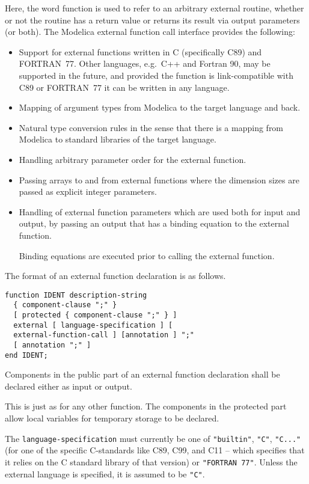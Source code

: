 Here, the word function is used to refer to an arbitrary external
routine, whether or not the routine has a return value or returns its
result via output parameters (or both). The Modelica external function
call interface provides the following:
\begin{itemize}
\item
  Support for external functions written in C (specifically C89) and
  FORTRAN~77. Other languages, e.g.\ C++ and Fortran 90, may be supported
  in the future, and provided the function is link-compatible with C89
  or FORTRAN~77 it can be written in any language.
\item
  Mapping of argument types from Modelica to the target language and
  back.
\item
  Natural type conversion rules in the sense that there is a mapping
  from Modelica to standard libraries of the target language.
\item
  Handling arbitrary parameter order for the external function.
\item
  Passing arrays to and from external functions where the dimension
  sizes are passed as explicit integer parameters.
\item
  Handling of external function parameters which are used both for input
  and output, by passing an output that has a binding equation to
  the external function.
  \begin{nonnormative}
  Binding equations are executed prior to calling the external function.
  \end{nonnormative}
\end{itemize}

The format of an external function declaration is as follows.
\begin{lstlisting}[language=grammar]
function IDENT description-string
  { component-clause ";" }
  [ protected { component-clause ";" } ]
  external [ language-specification ] [
  external-function-call ] [annotation ] ";"
  [ annotation ";" ]
end IDENT;
\end{lstlisting}

Components in the public part of an external function declaration shall
be declared either as input or output.

\begin{nonnormative}
This is just as for any other function.  The components in the protected part allow local variables for temporary storage to be declared.
\end{nonnormative}

The \lstinline!language-specification! must currently be one of \lstinline!"builtin"!,
\lstinline!"C"!, \lstinline!"C..."! (for one of the specific C-standards like C89, C99, and C11
-- which specifies that it relies on the C standard library of that
version) or \lstinline!"FORTRAN 77"!. Unless the external language is specified, it
is assumed to be \lstinline!"C"!.


